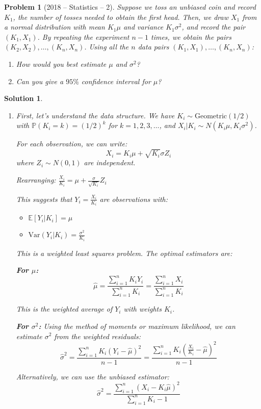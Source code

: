 \documentclass[12pt]{amsart}
\newtheorem{problem}{Problem}
\newtheorem*{solution}{Solution}
\begin{document}
\begin{problem}[2018 -- Statistics -- 2]
Suppose we toss an unbiased coin and record $K_1$, the number of tosses needed to obtain the first head. Then, we draw $X_1$ from a normal distribution with mean $K_1 \mu$ and variance $K_1 \sigma^2$, and record the pair $(K_1, X_1)$. By repeating the experiment $n-1$ times, we obtain the pairs $(K_2, X_2), \ldots,(K_n, X_n)$. Using all the $n$ data pairs $(K_1, X_1), \ldots,(K_n, X_n)$:
\begin{enumerate}[label=(\alph*)]
\item How would you best estimate $\mu$ and $\sigma^2$?
\item Can you give a $95 \%$ confidence interval for $\mu$?
\end{enumerate}
\end{problem}
\begin{solution}
\begin{enumerate}[label=(\alph*)]
\item First, let's understand the data structure. We have $K_i \sim \text{Geometric}(1/2)$ with $\mathbb{P}(K_i = k) = (1/2)^k$ for $k = 1, 2, 3, \ldots$, and $X_i | K_i \sim N(K_i \mu, K_i \sigma^2)$.

For each observation, we can write:
$$X_i = K_i \mu + \sqrt{K_i} \sigma Z_i$$
where $Z_i \sim N(0,1)$ are independent.

Rearranging: $\frac{X_i}{K_i} = \mu + \frac{\sigma}{\sqrt{K_i}} Z_i$

This suggests that $Y_i = \frac{X_i}{K_i}$ are observations with:
\begin{itemize}
\item $\mathbb{E}[Y_i | K_i] = \mu$
\item $\text{Var}(Y_i | K_i) = \frac{\sigma^2}{K_i}$
\end{itemize}
This is a weighted least squares problem. The optimal estimators are:

\textbf{For $\mu$: }
$$\hat{\mu} = \frac{\sum_{i=1}^n K_i Y_i}{\sum_{i=1}^n K_i} = \frac{\sum_{i=1}^n X_i}{\sum_{i=1}^n K_i}$$

This is the weighted average of $Y_i$ with weights $K_i$.

\textbf{For $\sigma^2$:}
Using the method of moments or maximum likelihood, we can estimate $\sigma^2$ from the weighted residuals:
$$\hat{\sigma}^2 = \frac{\sum_{i=1}^n K_i (Y_i - \hat{\mu})^2}{n-1} = \frac{\sum_{i=1}^n K_i \left(\frac{X_i}{K_i} - \hat{\mu}\right)^2}{n-1}$$

Alternatively, we can use the unbiased estimator:
$$\hat{\sigma}^2 = \frac{\sum_{i=1}^n (X_i - K_i \hat{\mu})^2}{\sum_{i=1}^n K_i - 1}$$


\end{enumerate}
\end{solution}
\end{document}
